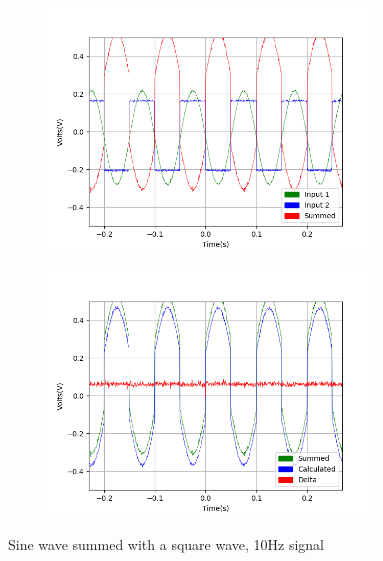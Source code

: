 \begin{figure}[h!]
\centering
\begin{subfigure}[t]{.475\textwidth}
  \centering
  \includegraphics[width=0.95\textwidth, height=0.20\textheight]{figures/Summing/scope_6raw.png}
 \label{fig:sum_6_og_data}
\end{subfigure}\hfill
\begin{subfigure}[t]{.475\textwidth}
  \centering
  \includegraphics[width=0.95\textwidth, height=0.20\textheight]{figures/Summing/scope_6.png}
\label{fig:sum_6_calc_data}
\end{subfigure}
\caption{Sine wave summed with a square wave, 10Hz signal}
\end{figure}

